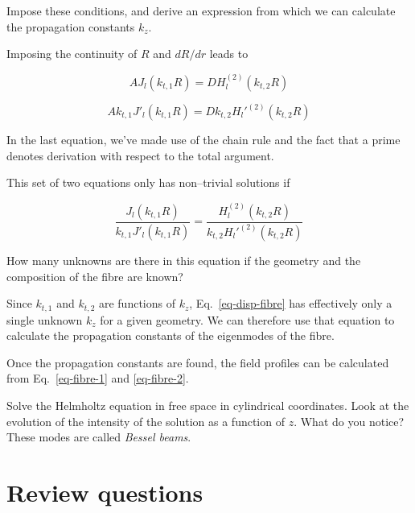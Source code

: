 \begin{cue}
Impose these conditions, and derive an expression from which we can calculate the propagation constants $k_z$. 
\end{cue}

Imposing the continuity of $R$ and $d R / dr$ leads to

\begin{equation}
A J_l\left(k_{t,1}R\right) = D H_l^{(2)}\left(k_{t,2}R\right)
\end{equation} 

\begin{equation}
A k_{t,1} J'_l\left(k_{t,1}R\right) = D k_{t,2} H_l'^{(2)}\left(k_{t,2}R\right)
\end{equation} 

In the last equation, we've made use of the chain rule and the fact that a prime denotes derivation with respect to the total argument.

This set of two equations only has non--trivial solutions if

\begin{equation}
\frac{J_l\left(k_{t,1}R\right)}{k_{t,1} J'_l\left(k_{t,1}R\right)} = \frac{H_l^{(2)}\left(k_{t,2}R\right)}{k_{t,2} H_l'^{(2)}\left(k_{t,2}R\right)} \label{eq-disp-fibre}
\end{equation}

\begin{cue}
How many unknowns are there in this equation if the geometry and the composition of the fibre are known?  
\end{cue}

Since $k_{t,1}$ and $k_{t,2}$ are functions of $k_z$, Eq.~\ref{eq-disp-fibre} has effectively only a single unknown $k_z$ for a given geometry. We can therefore use that equation to calculate the propagation constants of the eigenmodes of the fibre.

Once the propagation constants are found, the field profiles can be calculated from Eq.~\ref{eq-fibre-1} and \ref{eq-fibre-2}.


\begin{exer}
Solve the Helmholtz equation in free space in cylindrical coordinates. Look at the evolution of the intensity of the solution as a function of $z$. What do you notice? These modes are called \emph{Bessel beams}.
\end{exer}



\section*{Review questions}

